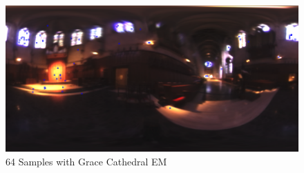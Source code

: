 \documentclass[12pt,twoside]{article}
\begin{document}
    \begin{figure}[H]
        \centering %
            \includegraphics[width = 6in]{./CO417_Figure/MC_64.png} 
            \caption{64 Samples with Grace Cathedral EM} %
            \label{fig:imperial figure} %
            
             \end{figure}
\end{document}
